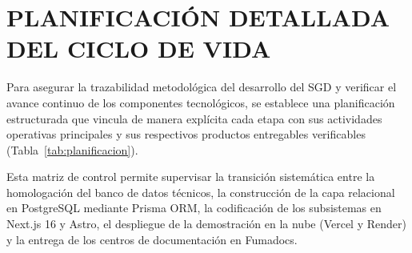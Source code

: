 \section{PLANIFICACIÓN DETALLADA DEL CICLO DE VIDA}

Para asegurar la trazabilidad metodológica del desarrollo del SGD y verificar el avance continuo de los componentes tecnológicos, se establece una planificación estructurada que vincula de manera explícita cada etapa con sus actividades operativas principales y sus respectivos productos entregables verificables (Tabla~\ref{tab:planificacion}).

Esta matriz de control permite supervisar la transición sistemática entre la homologación del banco de datos técnicos, la construcción de la capa relacional en PostgreSQL mediante Prisma ORM, la codificación de los subsistemas en Next.js 16 y Astro, el despliegue de la demostración en la nube (Vercel y Render) y la entrega de los centros de documentación en Fumadocs.

